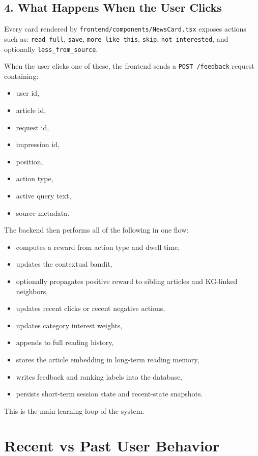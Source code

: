 \documentclass[12pt]{article}
\begin{document}
\subsection{4. What Happens When the User Clicks}
Every card rendered by \texttt{frontend/components/NewsCard.tsx} exposes actions such as:
\texttt{read\_full}, \texttt{save}, \texttt{more\_like\_this}, \texttt{skip}, \texttt{not\_interested}, and optionally \texttt{less\_from\_source}.

When the user clicks one of these, the frontend sends a \texttt{POST /feedback} request containing:
\begin{itemize}[leftmargin=1.5em]
  \item user id,
  \item article id,
  \item request id,
  \item impression id,
  \item position,
  \item action type,
  \item active query text,
  \item source metadata.
\end{itemize}

The backend then performs all of the following in one flow:
\begin{itemize}[leftmargin=1.5em]
  \item computes a reward from action type and dwell time,
  \item updates the contextual bandit,
  \item optionally propagates positive reward to sibling articles and KG-linked neighbors,
  \item updates recent clicks or recent negative actions,
  \item updates category interest weights,
  \item appends to full reading history,
  \item stores the article embedding in long-term reading memory,
  \item writes feedback and ranking labels into the database,
  \item persists short-term session state and recent-state snapshots.
\end{itemize}

This is the main learning loop of the system.

\section{Recent vs Past User Behavior}
\end{document}
